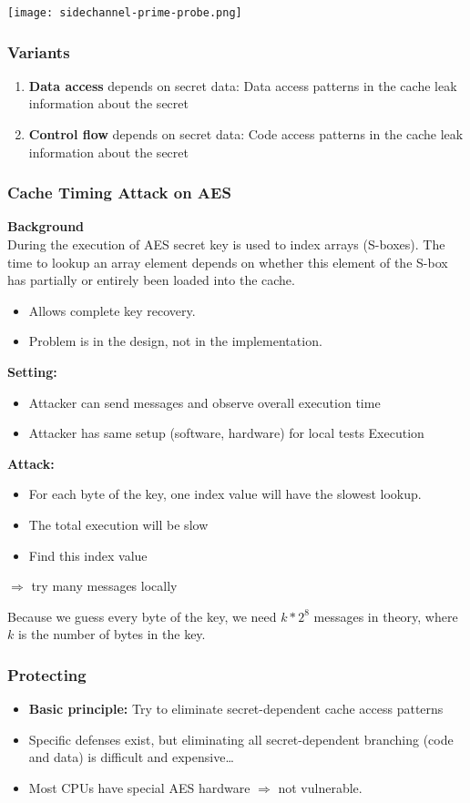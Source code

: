\texttt{[image: sidechannel-prime-probe.png]}


\subsubsection{Variants}
\begin{enumerate}
  \item \textbf{Data access} depends on secret data: Data access patterns
    in the cache leak information about the secret
  \item \textbf{Control flow} depends on secret data: Code access
    patterns in the cache leak information about the secret
\end{enumerate}
\subsubsection{Cache Timing Attack on AES}
\textbf{Background}\\
During the execution of AES secret key is used to
index arrays (S-boxes). The time to lookup an array element depends
on whether this element of the S-box has partially or entirely been loaded into the
cache.
\begin{itemize}
  \item Allows complete key recovery.
  \item Problem is in the design, not in the implementation.
\end{itemize}

\textbf{Setting:}
\begin{itemize}
  \item Attacker can send messages and observe overall execution time
  \item Attacker has same setup (software, hardware) for local tests
    Execution
\end{itemize}

\textbf{Attack:}
\begin{itemize}
  \item For each byte of the key, one index value will have the slowest lookup.
  \item The total execution will be slow
  \item Find this index value
\end{itemize}
$\Rightarrow$  try many messages locally

Because we guess every byte of the key, we need $k * 2^8$ messages in theory, where $k$ is the number of bytes in the key.

\subsubsection{Protecting}
\begin{itemize}
  \item \textbf{Basic principle:}
    Try to eliminate secret-dependent cache access patterns
  \item Specific defenses exist, but eliminating all secret-dependent
    branching (code and data) is difficult and expensive…
  \item Most CPUs have special AES hardware  $\Rightarrow$ not vulnerable.
\end{itemize}


